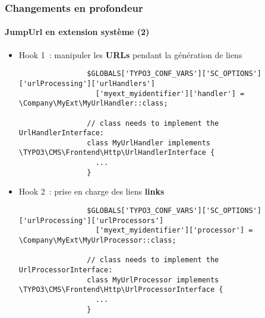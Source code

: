 
\begin{frame}[fragile]
	\frametitle{Changements en profondeur}
	\framesubtitle{JumpUrl en extension système (2)}

	\lstset{basicstyle=\tiny\ttfamily}

	\begin{itemize}

		\item Hook 1~: manipuler les \textbf{URLs} pendant la génération de liens

			\begin{lstlisting}
				$GLOBALS['TYPO3_CONF_VARS']['SC_OPTIONS']['urlProcessing']['urlHandlers']
				  ['myext_myidentifier']['handler'] = \Company\MyExt\MyUrlHandler::class;

				// class needs to implement the UrlHandlerInterface:
				class MyUrlHandler implements \TYPO3\CMS\Frontend\Http\UrlHandlerInterface {
				  ...
				}
			\end{lstlisting}

		\item Hook 2~: prise en charge des liens \textbf{links}

			\begin{lstlisting}
				$GLOBALS['TYPO3_CONF_VARS']['SC_OPTIONS']['urlProcessing']['urlProcessors']
				  ['myext_myidentifier']['processor'] = \Company\MyExt\MyUrlProcessor::class;

				// class needs to implement the UrlProcessorInterface:
				class MyUrlProcessor implements \TYPO3\CMS\Frontend\Http\UrlProcessorInterface {
				  ...
				}
			\end{lstlisting}

	\end{itemize}

\end{frame}


